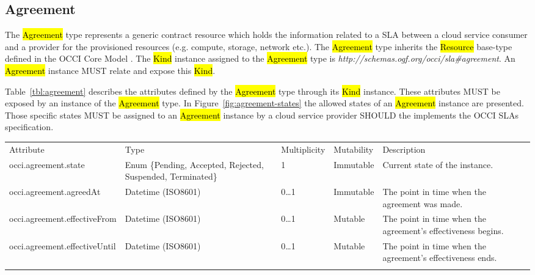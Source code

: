\documentclass[10pt,a4paper]{article}
\begin{document}
\subsection{Agreement}

The \hl{Agreement} type represents a generic contract resource which holds the information related to a SLA between a cloud service consumer and a provider for the provisioned resources (e.g. compute, storage, network etc.). The \hl{Agreement} type inherits the \hl{Resource} base-type defined in the OCCI Core Model \cite{occi:core}. The \hl{Kind} instance assigned to the \hl{Agreement} type is \textit{http://schemas.ogf.org/occi/sla\#agreement}. An \hl{Agreement} instance MUST relate and expose this \hl{Kind}.

Table~\ref{tbl:agreement} describes the attributes defined by the \hl{Agreement} type through its \hl{Kind} instance. These attributes MUST be exposed by an instance of the \hl{Agreement} type. In Figure~\ref{fig:agreement-states} the allowed states of an \hl{Agreement} instance are presented. Those specific states MUST be assigned to an \hl{Agreement} instance by a cloud service provider SHOULD the implements the OCCI SLAs specification.


{
	\begin{tabular}{lp{2.5cm}p{1cm}lp{6cm}}
	\toprule
	Attribute&Type&Multi\-plicity&Mutability&Description\\
	\colrule
	occi.agreement.state & Enum \{Pending, Accepted, Rejected, Suspended, Terminated\} & 1 & Immutable & Current state of the instance.\\
	occi.agreement.agreedAt & Datetime (ISO8601) & 0\ldots1 & Immutable & The point in time when the agreement was made. \\
	occi.agreement.effectiveFrom & Datetime (ISO8601) & 0\ldots1 & Mutable & The point in time when the agreement’s effectiveness begins. \\
	occi.agreement.effectiveUntil & Datetime (ISO8601) & 0\ldots1 & Mutable & The point in time when the agreement’s effectiveness ends. \\
	\botrule
	\end{tabular}
}
\end{document}

